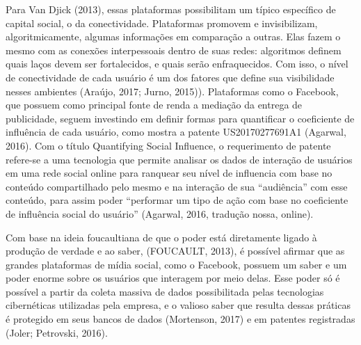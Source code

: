 Para Van Djick (2013), essas plataformas possibilitam um típico
específico de capital social, o da conectividade. Plataformas promovem e
invisibilizam, algoritmicamente, algumas informações em comparação a
outras. Elas fazem o mesmo com as conexões interpessoais dentro de suas
redes: algoritmos definem quais laços devem ser fortalecidos, e quais
serão enfraquecidos. Com isso, o nível de conectividade de cada usuário
é um dos fatores que define sua visibilidade nesses ambientes (Araújo,
2017; Jurno, 2015)). Plataformas como o Facebook, que possuem como
principal fonte de renda a mediação da entrega de publicidade, seguem
investindo em definir formas para quantificar o coeficiente de
influência de cada usuário, como mostra a patente US20170277691A1
(Agarwal, 2016). Com o título Quantifying Social Influence, o
requerimento de patente refere-se a uma tecnologia que permite analisar
os dados de interação de usuários em uma rede social online para
ranquear seu nível de influencia com base no conteúdo compartilhado pelo
mesmo e na interação de sua ``audiência'' com esse conteúdo, para assim
poder ``performar um tipo de ação com base no coeficiente de influência
social do usuário'' (Agarwal, 2016, tradução nossa, online).

Com base na ideia foucaultiana de que o poder está diretamente ligado à
produção de verdade e ao saber,
\protect\hypertarget{__Fieldmark__1228_1356454502}{}{}(FOUCAULT,
2013)\protect\hypertarget{__Fieldmark__324_193002426}{}{\protect\hypertarget{__Fieldmark__1240_1804063266}{}{\protect\hypertarget{__Fieldmark__349_1743353457}{}{\protect\hypertarget{__Fieldmark__3242_70101425}{}{}}}},
é possível afirmar que as grandes plataformas de mídia social, como o
Facebook, possuem um saber e um poder enorme sobre os usuários que
interagem por meio delas. Esse poder só é possível a partir da coleta
massiva de dados possibilitada pelas tecnologias cibernéticas utilizadas
pela empresa, e o valioso saber que resulta dessas práticas é protegido
em seus bancos de dados
\protect\hypertarget{__Fieldmark__1254_1356454502}{}{}(Mortenson,
2017)\protect\hypertarget{__Fieldmark__352_193002426}{}{\protect\hypertarget{__Fieldmark__370_1743353457}{}{}}
e em patentes registradas
\protect\hypertarget{__Fieldmark__1271_1356454502}{}{}(Joler; Petrovski,
2016)\protect\hypertarget{__Fieldmark__368_193002426}{}{\protect\hypertarget{__Fieldmark__375_1743353457}{}{}}.

